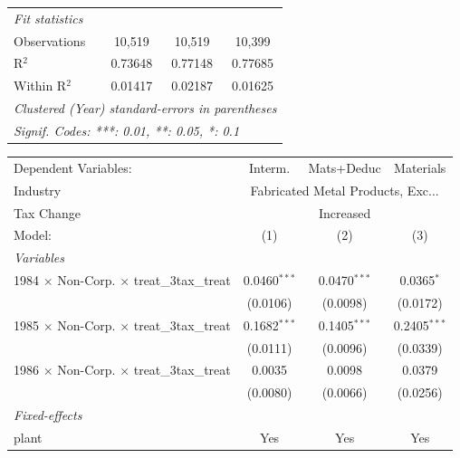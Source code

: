 \documentclass[
  12pt]{article}
\theoremstyle{definition}
\theoremstyle{remark}
\begin{document}
\begin{table}
\begin{minipage}{\linewidth}
\begin{tabular}{lccc}
   \midrule
   \emph{Fit statistics}\\
   Observations                                            & 10,519         & 10,519         & 10,399\\  
   R$^2$                                                   & 0.73648        & 0.77148        & 0.77685\\  
   Within R$^2$                                            & 0.01417        & 0.02187        & 0.01625\\  
   \midrule \midrule
   \multicolumn{4}{l}{\emph{Clustered (Year) standard-errors in parentheses}}\\
   \multicolumn{4}{l}{\emph{Signif. Codes: ***: 0.01, **: 0.05, *: 0.1}}\\
\end{tabular}
\par\endgroup
\begingroup
\centering
\begin{tabular}{lccc}
   \tabularnewline \midrule \midrule
   Dependent Variables:                                    & Interm.        & Mats+Deduc     & Materials\\  
   Industry & \multicolumn{3}{c}{Fabricated Metal Products, Exc...} \\ 
   Tax Change & \multicolumn{3}{c}{Increased} \\ 
   Model:                                                  & (1)            & (2)            & (3)\\  
   \midrule
   \emph{Variables}\\
   1984 $\times$ Non-Corp. $\times$ treat\_3tax\_treat     & 0.0460$^{***}$ & 0.0470$^{***}$ & 0.0365$^{*}$\\   
                                                           & (0.0106)       & (0.0098)       & (0.0172)\\   
   1985 $\times$ Non-Corp. $\times$ treat\_3tax\_treat     & 0.1682$^{***}$ & 0.1405$^{***}$ & 0.2405$^{***}$\\   
                                                           & (0.0111)       & (0.0096)       & (0.0339)\\   
   1986 $\times$ Non-Corp. $\times$ treat\_3tax\_treat     & 0.0035         & 0.0098         & 0.0379\\   
                                                           & (0.0080)       & (0.0066)       & (0.0256)\\   
   \midrule
   \emph{Fixed-effects}\\
   plant                                                   & Yes            & Yes            & Yes\\  

\end{tabular}
\end{minipage}
\end{table}
\end{document}
